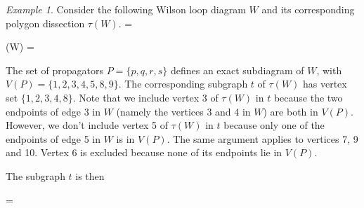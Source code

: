 \documentclass[11pt]{article}
\newcommand{\drawWLD}[2]{

\pgfmathsetmacro{\n}{#1}
\pgfmathsetmacro{\radius}{#2}
\pgfmathsetmacro{\angle}{360/\n}
\draw (0,0) circle (\radius);
    \foreach \i in {1,2,...,\n} {
      \draw (\angle*\i:\radius) node {$\bullet$};
    }

}
\newcommand{\drawpolypart}[2]{
\pgfmathsetmacro{\n}{#1}
\pgfmathsetmacro{\radius}{#2}
\pgfmathsetmacro{\angle}{360/\n}
    \foreach \i in {1,2,...,\n} {
      \draw (\angle*\i+ \angle/2:\radius) node {$\bullet$};
     \pgfmathsetmacro{\x}{\angle*\i - \angle/2}
      \pgfmathsetmacro{\concave}{((\n-1.5)/\n)}
      \draw (\x:\radius cm) .. controls (\angle *\i: \concave* \radius cm) .. (\x + \angle:\radius cm);
    }

}
\newcommand{\drawprop}[4]{
\pgfmathsetmacro{\r}{#1}
\pgfmathsetmacro{\bumpr}{#2}
\pgfmathsetmacro{\s}{#3}
\pgfmathsetmacro{\bumps}{#4}
\pgfmathsetmacro{\perturbe}{\angle/\n}

\begin{scope}
\draw[propagator] (\angle*\r + \angle/2 + \bumpr*\perturbe:\radius) -- (\angle*\s + \angle/2 + \bumps*\perturbe:\radius);
\end{scope}
}
\newcommand{\drawchord}[2]{
\pgfmathsetmacro{\r}{#1}
\pgfmathsetmacro{\s}{#2}

\begin{scope}
\draw (\angle*\r + \angle/2:\radius) -- (\angle*\s + \angle/2:\radius);
\end{scope}
}
\newcommand{\drawnumbers}{
  \foreach \i in {1,2,...,\n} {
  \pgfmathsetmacro{\x}{\angle*\i}
  \draw (\x:\radius*1.15) node {\footnotesize \i};
}
}
\newcommand{\drawnumbersshift}{
  \foreach \i in {1,2,...,\n} {
  \pgfmathsetmacro{\x}{\angle*\i + \angle/2}
  \draw (\x:\radius*1.15) node {\footnotesize \i};
}
}
\def\bas #1\eas{\begin{align*} #1 \end{align*}}
\theoremstyle{remark}
\newtheorem{eg}[thm]{Example}
\theoremstyle{definition}
\begin{document}
\begin{eg}\label{eg:subtrees}
Consider the following Wilson loop diagram $W$ and its corresponding polygon dissection $\tau(W)$. 
\bas W =   \; \qquad
\tau(W) =  \eas

The set of propagators $P= \{p,q,r,s \}$ defines an exact subdiagram of $W$, with $V(P) = \{1,2,3,4,5,8,9\}$.  The corresponding subgraph $t$ of $\tau(W)$ has vertex set $\{1, 2,3, 4, 8\}$. Note that we include vertex 3 of $\tau(W)$ in $t$ because the two endpoints of edge 3 in $W$ (namely the vertices 3 and 4 in $W$) are both in $V(P)$. However, we don't include vertex 5 of $\tau(W)$ in $t$ because only one of the endpoints of edge 5 in $W$ is in $V(P)$. The same argument applies to vertices 7, 9 and 10. Vertex 6 is excluded because none of its endpoints lie in $V(P)$. 

The subgraph $t$ is then 

\bas t = 
 \eas


\end{eg}
\end{document}
